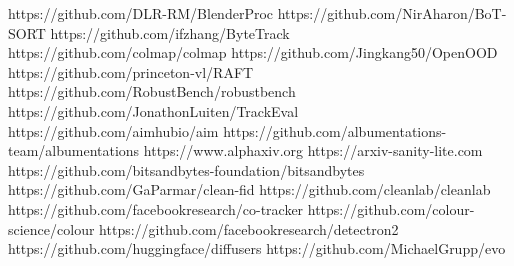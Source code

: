 \newcommand{\term}[1]{\textbf{#1}}                 %
\newcommand{\eng}[1]{\emph{#1}}                    %
\newcommand{\vn}[2]{\textbf{#1} (\emph{#2})}
\newcommand{\en}[1]{\textbf{\emph{#1}}}
\newcommand{\code}[1]{\texttt{#1}}
\usepackage{xstring}
\expandafter\def\csname repourl@BlenderProc\endcsname{https://github.com/DLR-RM/BlenderProc}
\expandafter\def\csname repourl@BoT-SORT\endcsname{https://github.com/NirAharon/BoT-SORT}
\expandafter\def\csname repourl@ByteTrack\endcsname{https://github.com/ifzhang/ByteTrack}
\expandafter\def\csname repourl@COLMAP\endcsname{https://github.com/colmap/colmap}
\expandafter\def\csname repourl@OpenOOD\endcsname{https://github.com/Jingkang50/OpenOOD}
\expandafter\def\csname repourl@RAFT\endcsname{https://github.com/princeton-vl/RAFT}
\expandafter\def\csname repourl@RobustBench\endcsname{https://github.com/RobustBench/robustbench}
\expandafter\def\csname repourl@TrackEval\endcsname{https://github.com/JonathonLuiten/TrackEval}
\expandafter\def\csname repourl@aim\endcsname{https://github.com/aimhubio/aim}
\expandafter\def\csname repourl@albumentations\endcsname{https://github.com/albumentations-team/albumentations}
\expandafter\def\csname repourl@alphaXiv\endcsname{https://www.alphaxiv.org}
\expandafter\def\csname repourl@arxiv-sanity\endcsname{https://arxiv-sanity-lite.com}
\expandafter\def\csname repourl@bitsandbytes\endcsname{https://github.com/bitsandbytes-foundation/bitsandbytes}
\expandafter\def\csname repourl@clean-fid\endcsname{https://github.com/GaParmar/clean-fid}
\expandafter\def\csname repourl@cleanlab\endcsname{https://github.com/cleanlab/cleanlab}
\expandafter\def\csname repourl@co-tracker\endcsname{https://github.com/facebookresearch/co-tracker}
\expandafter\def\csname repourl@colour-science\endcsname{https://github.com/colour-science/colour}
\expandafter\def\csname repourl@detectron2\endcsname{https://github.com/facebookresearch/detectron2}
\expandafter\def\csname repourl@diffusers\endcsname{https://github.com/huggingface/diffusers}
\expandafter\def\csname repourl@evo\endcsname{https://github.com/MichaelGrupp/evo}
